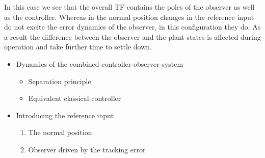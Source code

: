 In this case we see that the overall TF contains the poles of the observer as well as the controller.
Whereas in the normal position changes in the reference input do not excite the error dynamics of the observer, in this configuration they do.
As a result the difference between the observer and the plant states is affected during operation and take further time to settle down.


\ifslidesonly
\begin{slide}
   \begin{itemize}
   	\item Dynamics of the combined controller-observer system
\begin{itemize}
	\item Separation principle
	\item Equivalent classical controller
\end{itemize}
\item Introducing the reference input
\begin{enumerate}
	\item The normal position
	\item Observer driven by the tracking error
\end{enumerate}
   \end{itemize}
\end{slide}
\fi






\endinput


